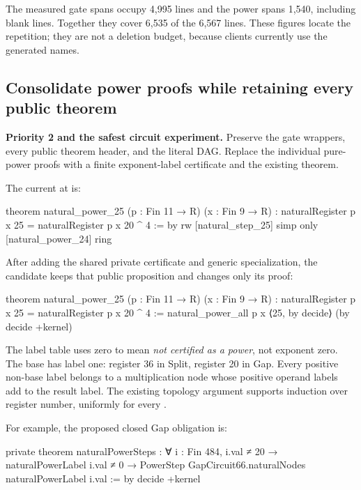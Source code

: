 The measured gate spans occupy 4,995 lines and the power spans 1,540,
including blank lines. Together they cover 6,535 of the 6,567 lines.
These figures locate the repetition; they are not a deletion budget, because
clients currently use the generated names.

\subsection{Consolidate power proofs while retaining every public theorem}
\label{sec:powercert}

\textbf{Priority 2 and the safest circuit experiment.} Preserve the gate
wrappers, every public theorem header, and the literal DAG. Replace the
individual pure-power  proofs with a finite exponent-label
certificate and the existing  theorem.

The current  at
 is:

\begin{Lean}
theorem natural_power_25 (p : Fin 11 → R) (x : Fin 9 → R) :
    naturalRegister p x 25 = naturalRegister p x 20 ^ 4 := by
  rw [natural_step_25]
  simp only [natural_power_24]
  ring
\end{Lean}

After adding the shared private certificate and generic specialization, the
candidate keeps that public proposition and changes only its proof:

\begin{Lean}
theorem natural_power_25 (p : Fin 11 → R) (x : Fin 9 → R) :
    naturalRegister p x 25 = naturalRegister p x 20 ^ 4 :=
  natural_power_all p x ⟨25, by decide⟩ (by decide +kernel)
\end{Lean}

The label table uses zero to mean \emph{not certified as a power}, not
exponent zero. The base has label one: register 36 in Split, register 20 in
Gap. Every positive non-base label belongs to a multiplication node whose
positive operand labels add to the result label. The existing topology
argument supports induction over register number, uniformly for every
.

For example, the proposed closed Gap obligation is:

\begin{Lean}
private theorem naturalPowerSteps : ∀ i : Fin 484,
    i.val ≠ 20 → naturalPowerLabel i.val ≠ 0 →
      PowerStep GapCircuit66.naturalNodes naturalPowerLabel i.val := by
  decide +kernel
\end{Lean}

